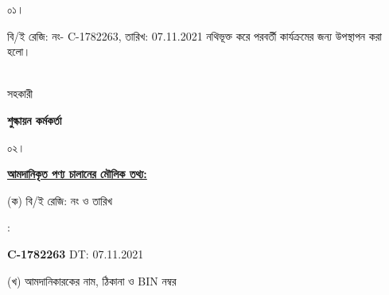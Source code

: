 \documentclass[12pt]{article}
\newcommand{\beno}{C-1782263}
\newcommand{\bedt}{07.11.2021}
\begin{document}
\noindent
\begin{minipage}[t]{0.05\linewidth}
০১।
\end{minipage}
\begin{minipage}[t]{0.95\linewidth}
বি/ই রেজি: নং- {\beno}, তারিখ: {\bedt}
নথিভূক্ত করে
পরবর্তী কার্যক্রমের জন্য উপস্থাপন করা হলো।
\\
\\
\end{minipage}
\begin{minipage}[t]{0.05\linewidth}
\hspace*{0em}
\end{minipage}
\begin{minipage}[t]{0.05\linewidth}
সহকারী
\end{minipage}
\begin{minipage}[t]{0.37\linewidth}
\hspace{0em}
\end{minipage}
\begin{minipage}[t]{0.53\linewidth}
\textbf{শুল্কায়ন কর্মকর্তা}
\\
\end{minipage}
\begin{minipage}[t]{0.05\linewidth}
০২।
\end{minipage}
\begin{minipage}[t]{0.95\linewidth}
\underline{\textbf {আমদানিকৃত পণ্য চালানের
মৌলিক তথ্য:}}
\\
\end{minipage}
\footnotesize
\begin{minipage}[t]{0.05\linewidth}
\hspace*{1em}
\end{minipage}
\begin{minipage}[t]{0.40\linewidth}
(ক) বি/ই রেজি: নং ও তারিখ
\end{minipage}
\begin{minipage}[t]{0.02\linewidth}
:
\end{minipage}
\begin{minipage}[t]{0.53\linewidth}
\textbf{{\beno}} \hspace{2em} DT: {\bedt}
\\
\end{minipage}
\begin{minipage}[t]{0.05\linewidth}
\hspace*{1em}
\end{minipage}
\begin{minipage}[t]{0.40\linewidth}
(খ) আমদানিকারকের নাম, ঠিকানা
ও BIN নম্বর
\end{minipage}
\end{document}
